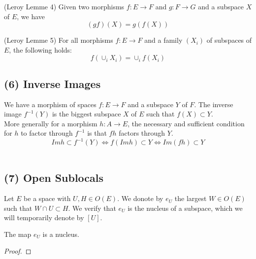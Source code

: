 \begin{lemma}
(Leroy Lemme 4)
    \label{lem:direct_images_transitive}
    Given two morphisms $f : E \rightarrow F$ and $g : F \rightarrow G$ and a subspace $X$ of $E$, we have
    \[(gf)(X) = g(f(X))\]
\end{lemma}

\begin{lemma}
(Leroy Lemme 5)
    \label{lem:direct_images_families}
    For all morphisms $f: E \rightarrow F$ and a family $(X_i)$ of subspaces of $E$, the following holds:
    \[f(\cup_i X_i) = \cup_i f(X_i)\]
\end{lemma}

\subsection{(6) Inverse Images}
\begin{definition}
    \label{def:inverse_images}
    We have a morphism of spaces $f : E \rightarrow F$ and a subspace $Y$ of $F$. The inverse image $f^{-1}(Y)$ is the biggest subspace $X$ of $E$ such that $f(X) \subset Y$. \\
    More generally for a morphism $h : A \rightarrow E$, the necessary and sufficient condition for $h$ to factor through $f^{-1}$ is that $fh$ factors through $Y$.
    \[Im h \subset f^{-1}(Y)\iff f(Im h) \subset Y \iff Im(fh) \subset Y \] \
\end{definition}

\subsection{(7) Open Sublocals}

\begin{definition}[$e_U$]
    \label{def:e_U}
    \lean{e_U}
    \leanok
    Let $E$ be a space with $U, H \in O(E)$. We donote by $e_U$ the largest $W \in O(E)$ such that $W \cap U \subset H$. We verify that $e_U$ is the nucleus of a subspace, which we will temporarily denote by $[U]$.
\end{definition}

\begin{lemma}[$e_U$ is a nucleus]
    \label{lem:e_U_nucleus}
    \leanok
    The map $e_U$ is a nucleus.
\end{lemma}
\begin{proof}
    \leanok
\end{proof}


